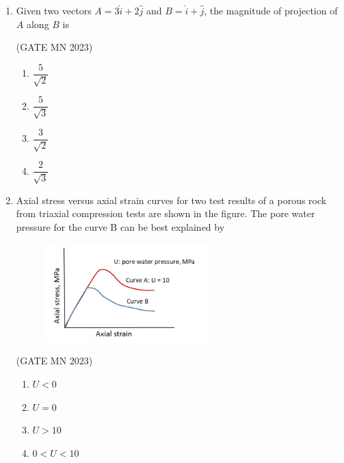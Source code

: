 \documentclass[journal]{IEEEtran}
\begin{document}
\begin{enumerate}
\hfill(GATE MN 2023)
\begin{multicols}{4}
\begin{enumerate}
    \item $\dfrac{\Delta x}{h}$  
    \item $\dfrac{\Delta x}{l}$  
    \item $\dfrac{2\Delta x}{h}$  
    \item $\dfrac{2\Delta x}{l}$  
\end{enumerate}
\end{multicols}

\item Given two vectors $A = 3\hat{i} + 2\hat{j}$ and $B = \hat{i} + \hat{j}$, the magnitude of projection of $A$ along $B$ is


	\hfill(GATE MN 2023)
\begin{multicols}{4}
\begin{enumerate}
    \item $\dfrac{5}{\sqrt{2}}$  
    \item $\dfrac{5}{\sqrt{3}}$  
    \item $\dfrac{3}{\sqrt{2}}$  
    \item $\dfrac{2}{\sqrt{3}}$  
\end{enumerate}
\end{multicols}
\item Axial stress versus axial strain curves for two test results of a porous rock from triaxial compression tests are shown in the figure.  
The pore water pressure for the curve B can be best explained by


    \begin{figure}[H]
    \centering
\includegraphics[width=0.6\textwidth]{Screenshot_2025_0822_113146.png}
\caption{}
    \label{fig:Q15}
\end{figure}


\hfill(GATE MN 2023)
\begin{multicols}{2}
\begin{enumerate}
    \item $U < 0$  
    \item $U = 0$  
    \item $U > 10$  
    \item $0 < U < 10$  
\end{enumerate}
\end{multicols}


\end{enumerate}
\end{document}
